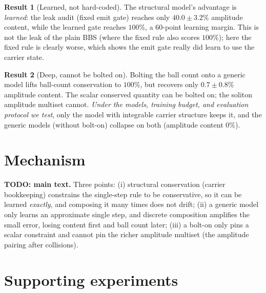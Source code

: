 \documentclass[11pt]{article}
\theoremstyle{definition}
\newtheorem{Result}{Result}
\theoremstyle{plain}
\begin{document}
\begin{Result}[Learned, not hard-coded]\label{res:genuine}
The structural model's advantage is \emph{learned}: the leak audit (fixed emit gate) reaches only
$40.0\pm3.2\%$ amplitude content, while the learned gate reaches $100\%$, a $60$-point learning
margin. This is not the leak of the plain BBS (where the fixed rule also scores $100\%$); here the
fixed rule is clearly worse, which shows the emit gate really did learn to use the carrier state.
\end{Result}

\begin{Result}[Deep, cannot be bolted on]\label{res:depth}
Bolting the ball count onto a generic model lifts ball-count conservation to $100\%$, but recovers
only $0.7\pm0.8\%$ amplitude content. The scalar conserved quantity can be bolted on; the soliton
amplitude multiset cannot. \emph{Under the models, training budget, and evaluation protocol we test},
only the model with integrable carrier structure keeps it, and the generic models (without bolt-on)
collapse on both (amplitude content $0\%$).
\end{Result}

\section{Mechanism}\label{sec:mechanism}
\textbf{TODO: main text.} Three points:
(i) structural conservation (carrier bookkeeping) constrains the single-step rule to be
conservative, so it can be learned \emph{exactly}, and composing it many times does not drift;
(ii) a generic model only learns an approximate single step, and discrete composition amplifies the
small error, losing content first and ball count later;
(iii) a bolt-on only pins a scalar constraint and cannot pin the richer amplitude multiset (the
amplitude pairing after collisions).

\section{Supporting experiments}\label{sec:support}
\end{document}
